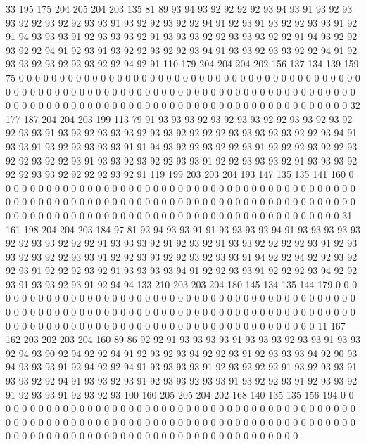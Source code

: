 33 195 175 204 205 204 203 135 81 89 93 94 93 92 92 92 92 93 94 93
91 93 92 93 93 92 92 93 92 92 93 93 91 93 92 92 93 92 92 94
91 92 93 91 93 92 92 93 93 91 92 91 94 93 93 93 91 92 93 93
93 92 91 93 93 93 92 92 93 93 93 92 92 91 94 93 92 92 93 92
92 94 91 92 93 91 93 92 92 93 92 92 93 94 91 93 93 92 93 93
92 92 94 91 92 93 93 92 93 92 92 93 92 92 94 92 91 110 179 204
204 204 202 156 137 134 139 159 75 0 0 0 0 0 0 0 0 0 0 0
0 0 0 0 0 0 0 0 0 0 0 0 0 0 0 0 0 0 0 0
0 0 0 0 0 0 0 0 0 0 0 0 0 0 0 0 0 0 0 0
0 0 0 0 0 0 0 0 0 0 0 0 0 0 0 0 0 0 0 0
0 0 0 0 0 0 0 0 0 0 0 0 0 0 0 0 0 0 0 0
0 0 0 0 0 0 0 0 0 0 0 0 0 0 0 0 0 0 0 0
0 0 0 0 0 0 0 0 0 0 0 0 0 0 0 0 32 177 187 204
204 203 199 113 79 91 93 93 93 92 93 92 93 93 92 92 93 93 92 93
92 92 93 93 91 93 92 92 93 93 93 92 93 93 92 92 92 92 93 93
93 92 93 92 92 93 94 91 93 93 91 93 92 92 93 93 93 91 91 94
93 92 92 93 92 92 93 91 92 92 92 93 92 92 93 92 92 93 92 92
93 91 93 93 92 93 92 92 93 93 91 92 92 93 93 93 92 91 93 93
93 92 92 92 93 93 92 92 92 92 93 92 91 119 199 203 203 204 193 147
135 135 141 160 0 0 0 0 0 0 0 0 0 0 0 0 0 0 0 0
0 0 0 0 0 0 0 0 0 0 0 0 0 0 0 0 0 0 0 0
0 0 0 0 0 0 0 0 0 0 0 0 0 0 0 0 0 0 0 0
0 0 0 0 0 0 0 0 0 0 0 0 0 0 0 0 0 0 0 0
0 0 0 0 0 0 0 0 0 0 0 0 0 0 0 0 0 0 0 0
0 0 0 0 0 0 0 0 0 0 0 0 0 0 0 0 0 0 0 0
0 0 0 0 0 0 0 0 0 0 0 0 31 161 198 204 204 203 184 97
81 92 94 93 93 91 91 93 93 93 92 94 91 93 93 93 93 93 92 92
93 93 92 92 92 91 93 93 93 92 91 92 93 92 91 93 93 92 92 92
92 93 91 92 93 93 92 93 92 92 93 93 91 92 92 93 93 92 92 93
92 93 93 91 94 92 92 94 92 92 93 92 92 93 91 92 92 92 93 92
91 93 93 93 93 94 91 92 92 93 93 91 92 92 92 93 94 92 92 93
91 93 93 92 93 91 92 94 94 133 210 203 203 204 180 145 134 135 144 179
0 0 0 0 0 0 0 0 0 0 0 0 0 0 0 0 0 0 0 0
0 0 0 0 0 0 0 0 0 0 0 0 0 0 0 0 0 0 0 0
0 0 0 0 0 0 0 0 0 0 0 0 0 0 0 0 0 0 0 0
0 0 0 0 0 0 0 0 0 0 0 0 0 0 0 0 0 0 0 0
0 0 0 0 0 0 0 0 0 0 0 0 0 0 0 0 0 0 0 0
0 0 0 0 0 0 0 0 0 0 0 0 0 0 0 0 0 0 0 0
0 0 0 0 0 0 0 11 167 162 203 202 203 204 160 89 86 92 92 91
93 93 93 93 91 93 93 93 92 93 93 91 93 93 92 94 93 90 92 94
92 92 94 91 92 93 92 93 94 92 92 93 91 92 93 93 93 94 92 90
93 94 93 93 93 91 92 94 92 92 94 91 93 93 93 93 91 92 93 92
92 92 91 93 92 93 93 91 93 93 92 92 94 91 93 93 92 93 91 92
93 93 92 93 93 91 93 92 92 93 91 92 93 93 92 91 92 93 93 91
92 93 92 93 100 160 205 205 204 202 168 140 135 135 156 194 0 0 0 0
0 0 0 0 0 0 0 0 0 0 0 0 0 0 0 0 0 0 0 0
0 0 0 0 0 0 0 0 0 0 0 0 0 0 0 0 0 0 0 0
0 0 0 0 0 0 0 0 0 0 0 0 0 0 0 0 0 0 0 0
0 0 0 0 0 0 0 0 0 0 0 0 0 0 0 0 0 0 0 0
0 0 0 0 0 0 0 0 0 0 0 0 0 0 0 0 0 0 0 0
0 0 0 0 0 0 0 0 0 0 0 0 0 0 0 0 0 0 0 0
